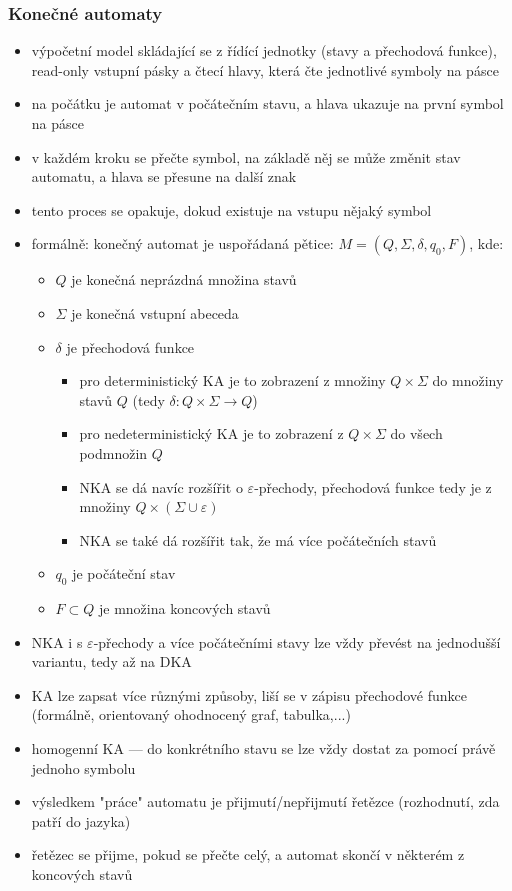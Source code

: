 \subsubsection*{Konečné automaty}
\begin{itemize}
	\item výpočetní model skládající se z řídící jednotky (stavy a přechodová funkce), read-only vstupní pásky a čtecí hlavy, která čte jednotlivé symboly na pásce
	\item na počátku je automat v počátečním stavu, a hlava ukazuje na první symbol na pásce
	\item v každém kroku se přečte symbol, na základě něj se může změnit stav automatu, a hlava se přesune na další znak
	\item tento proces se opakuje, dokud existuje na vstupu nějaký symbol
	\item formálně: konečný automat je uspořádaná pětice: $M = (Q, \Sigma, \delta, q_0, F)$, kde:
	\begin{itemize}
		\item $Q$ je konečná neprázdná množina stavů
		\item $\Sigma$ je konečná vstupní abeceda
		\item $\delta$ je přechodová funkce
		\begin{itemize}
			\item pro deterministický KA je to zobrazení z množiny $Q \times \Sigma$ do množiny stavů $Q$ (tedy $\delta: Q \times \Sigma \rightarrow Q$)
			\item pro nedeterministický KA je to zobrazení z $Q \times \Sigma$ do všech podmnožin $Q$
			\item NKA se dá navíc rozšířit o $\varepsilon$-přechody, přechodová funkce tedy je z množiny $Q \times (\Sigma \cup \varepsilon)$
			\item NKA se také dá rozšířit tak, že má více počátečních stavů
		\end{itemize}
		\item $q_0$ je počáteční stav
		\item $F \subset Q$ je množina koncových stavů
	\end{itemize}
	\item NKA i s $\varepsilon$-přechody a více počátečními stavy lze vždy převést na jednodušší variantu, tedy až na DKA
	\item KA lze zapsat více různými způsoby, liší se v zápisu přechodové funkce (formálně, orientovaný ohodnocený graf, tabulka,...)
	\item homogenní KA --- do konkrétního stavu se lze vždy dostat za pomocí právě jednoho symbolu
	\item výsledkem "práce" automatu je přijmutí/nepřijmutí řetězce (rozhodnutí, zda patří do jazyka)
	\item řetězec se přijme, pokud se přečte celý, a automat skončí v některém z koncových stavů
\end{itemize}

